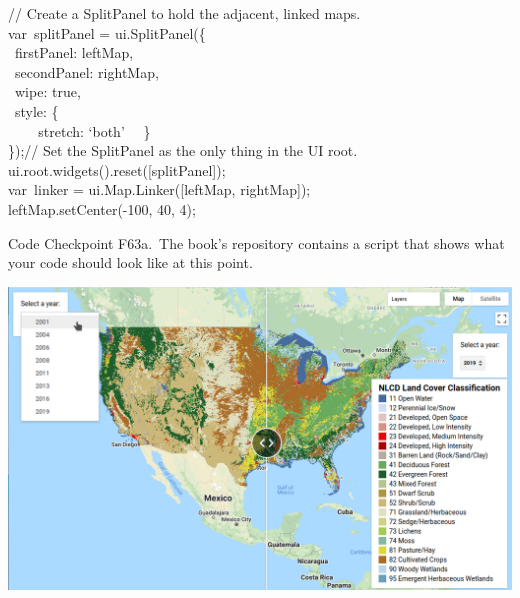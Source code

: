 \documentclass[
  letterpaper,
  DIV=11,
  numbers=noendperiod]{scrreprt}
\begin{document}
// Create a SplitPanel to hold the adjacent, linked maps.\\
var~splitPanel = ui.SplitPanel(\{\\
\hspace*{0.333em} ~firstPanel: leftMap,\\
\hspace*{0.333em} ~secondPanel: rightMap,\\
\hspace*{0.333em} ~wipe: true,\\
\hspace*{0.333em} ~style: \{\\
\hspace*{0.333em} ~ ~ ~stretch: `both'~ ~\}\\
\});// Set the SplitPanel as the only thing in the UI root.\\
ui.root.widgets().reset({[}splitPanel{]});\\
var~linker = ui.Map.Linker({[}leftMap, rightMap{]});\\
leftMap.setCenter(-100, 40, 4);

\begin{tcolorbox}[enhanced jigsaw, left=2mm, breakable, rightrule=.15mm, opacityback=0, colframe=quarto-callout-note-color-frame, colbacktitle=quarto-callout-note-color!10!white, arc=.35mm, opacitybacktitle=0.6, toptitle=1mm, colback=white, leftrule=.75mm, title=\textcolor{quarto-callout-note-color}{\faInfo}\hspace{0.5em}{Note}, toprule=.15mm, bottomtitle=1mm, titlerule=0mm, bottomrule=.15mm, coltitle=black]

Code Checkpoint F63a.~The book's repository contains a script that shows
what your code should look like at this point.

\end{tcolorbox}

\includegraphics{./F6/image32.png}
\end{document}
